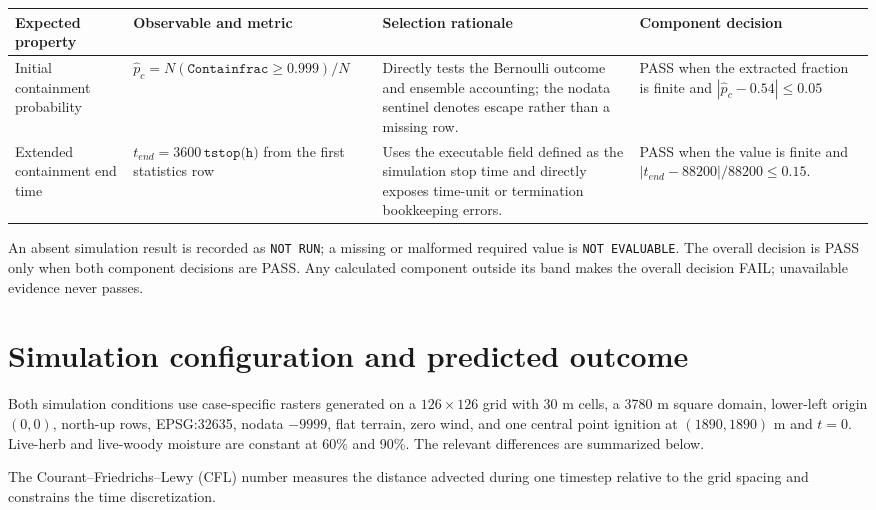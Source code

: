 \begin{center}
\begin{tabular}{@{}p{}p{}p{}p{}@{}}
\toprule
Expected property & Observable and metric & Selection rationale & Component decision \\
\midrule
Initial containment probability & $\widehat p_c=N(\texttt{Containfrac}\ge0.999)/N$ & Directly tests the Bernoulli outcome and ensemble accounting; the nodata sentinel denotes escape rather than a missing row. & PASS when the extracted fraction is finite and $|\widehat p_c-0.54|\le0.05$ \\
Extended containment end time & $t_{end}=3600\,\texttt{tstop(h)}$ from the first statistics row & Uses the executable field defined as the simulation stop time and directly exposes time-unit or termination bookkeeping errors. & PASS when the value is finite and $|t_{end}-88200|/88200\le0.15$. \\
\bottomrule
\end{tabular}
\end{center}

An absent simulation result is recorded as \texttt{NOT RUN}; a missing or
malformed required value is \texttt{NOT EVALUABLE}. The overall decision is
PASS only when both component decisions are PASS. Any calculated component
outside its band makes the overall decision FAIL; unavailable evidence never passes.

\section{Simulation configuration and predicted outcome}

Both simulation conditions use case-specific rasters generated on a $126\times126$ grid with 30 m cells, a 3780 m square domain, lower-left origin $(0,0)$, north-up rows, EPSG:32635, nodata $-9999$, flat terrain, zero wind, and one central point ignition at $(1890,1890)$ m and $t=0$. Live-herb and live-woody moisture are constant at 60\% and 90\%. The relevant differences are summarized below.

The Courant--Friedrichs--Lewy (CFL) number measures the distance
advected during one timestep relative to the grid spacing and
constrains the time discretization.

